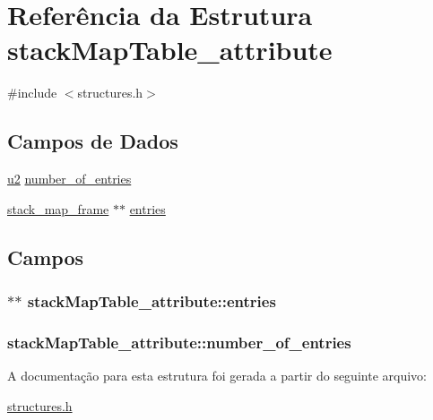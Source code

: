 \hypertarget{structstackMapTable__attribute}{}\section{Referência da Estrutura stack\+Map\+Table\+\_\+attribute}
\label{structstackMapTable__attribute}


{\ttfamily \#include $<$structures.\+h$>$}

\subsection*{Campos de Dados}
\begin{DoxyCompactItemize}
\item 
\hyperlink{lista__operandos_8h_a732cde1300aafb73b0ea6c2558a7a54f}{u2} \hyperlink{structstackMapTable__attribute_a3bccf778bae6ecac485fb942eb82a478}{number\+\_\+of\+\_\+entries}
\item 
\hyperlink{structstack__map__frame}{stack\+\_\+map\+\_\+frame} $\ast$$\ast$ \hyperlink{structstackMapTable__attribute_a064170c738925362875e3337defc60d0}{entries}
\end{DoxyCompactItemize}


\subsection{Campos}
\subsubsection[{\texorpdfstring{entries}{entries}}]{$\ast$$\ast$ stack\+Map\+Table\+\_\+attribute\+::entries}\hypertarget{structstackMapTable__attribute_a064170c738925362875e3337defc60d0}{}\label{structstackMapTable__attribute_a064170c738925362875e3337defc60d0}
\subsubsection[{\texorpdfstring{number\+\_\+of\+\_\+entries}{number_of_entries}}]{ stack\+Map\+Table\+\_\+attribute\+::number\+\_\+of\+\_\+entries}\hypertarget{structstackMapTable__attribute_a3bccf778bae6ecac485fb942eb82a478}{}\label{structstackMapTable__attribute_a3bccf778bae6ecac485fb942eb82a478}


A documentação para esta estrutura foi gerada a partir do seguinte arquivo\+:\begin{DoxyCompactItemize}
\item 
\hyperlink{structures_8h}{structures.\+h}\end{DoxyCompactItemize}
